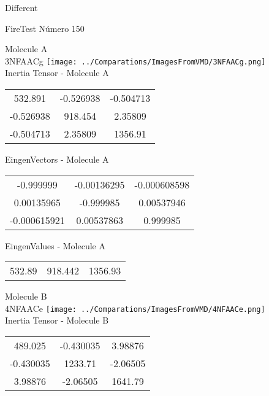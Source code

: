 \begin{center}
\vtab
\vtab
\textcolor{NavyBlue}{\Large Different}
\end{center}

 \newpage

\vtab[-2cm]
\begin{center}
{\large FireTest \tab Número 150}
\end{center}
\begin{multicols}{2}
\begin{center}

Molecule A \\ 
3NFAACg
\texttt{[image: ../Comparations/ImagesFromVMD/3NFAACg.png]}
\\
Inertia Tensor - Molecule A \\
\vtab

\begin{tabular}{|c c c|}
532.891	 & 	-0.526938	 & 	-0.504713	 \\
-0.526938	 & 	918.454	 & 	2.35809	 \\
-0.504713	 & 	2.35809	 & 	1356.91
\end{tabular}

\vtab
 EingenVectors - Molecule A     \\
\vtab
\begin{tabular}{|c c c|}
-0.999999	 & 	-0.00136295	 & 	-0.000608598	 \\
0.00135965	 & 	-0.999985	 & 	0.00537946	 \\
-0.000615921	 & 	0.00537863	 & 	0.999985
\end{tabular}

\vtab
 EingenValues - Molecule A     \\
\vtab
\begin{tabular}{|c c c|}
532.89	 & 	918.442	 & 	1356.93	 \\
\end{tabular}
\columnbreak

Molecule B \\ 
4NFAACe
\texttt{[image: ../Comparations/ImagesFromVMD/4NFAACe.png]}
\\
Inertia Tensor - Molecule B \\
\vtab

\begin{tabular}{|c c c|}
489.025	 & 	-0.430035	 & 	3.98876	 \\
-0.430035	 & 	1233.71	 & 	-2.06505	 \\
3.98876	 & 	-2.06505	 & 	1641.79
\end{tabular}


\end{center}
\end{multicols}
